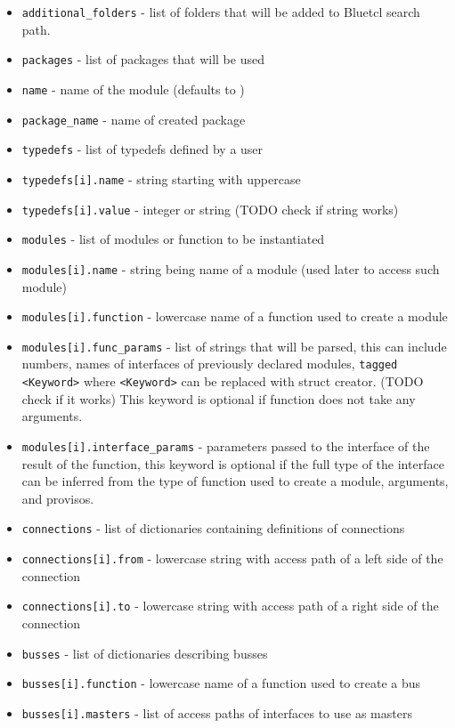 \documentclass[12pt]{report}
\begin{document}
\begin{itemize} 
   \item \verb!additional_folders! - list of folders that will be added to Bluetcl search path. 
   \item \verb!packages! - list of packages that will be used 
   \item \verb!name! - name of the module (defaults to ) 
   \item \verb!package_name! - name of created package 
   \item \verb!typedefs! - list of typedefs defined by a user 
   \item \verb!typedefs[i].name! - string starting with uppercase 
   \item \verb!typedefs[i].value! - integer or string (TODO check if string works) 
   \item \verb!modules! - list of modules or function to be instantiated 
   \item \verb!modules[i].name! - string being name of a module (used later to access such module) 
   \item \verb!modules[i].function! - lowercase name of a function used to create a module 
   \item \verb!modules[i].func_params! - list of strings that will be parsed, this can include numbers, names of interfaces of previously declared modules, \verb!tagged <Keyword>! where \verb!<Keyword>! can be replaced with struct creator. (TODO check if it works) This keyword is optional if function does not take any arguments. 
   \item \verb!modules[i].interface_params! - parameters passed to the interface of the result of the function, this keyword is optional if the full type of the interface can be inferred from the type of function used to create a module, arguments, and provisos. 
   \item \verb!connections! - list of dictionaries containing definitions of connections 
   \item \verb!connections[i].from! - lowercase string with access path of a left side of the connection 
   \item \verb!connections[i].to! - lowercase string with access path of a right side of the connection  
   \item \verb!busses! - list of dictionaries describing busses 
   \item \verb!busses[i].function! - lowercase name of a function used to create a bus 
   \item \verb!busses[i].masters! - list of access paths of interfaces to use as masters 

\end{itemize}
\end{document}
